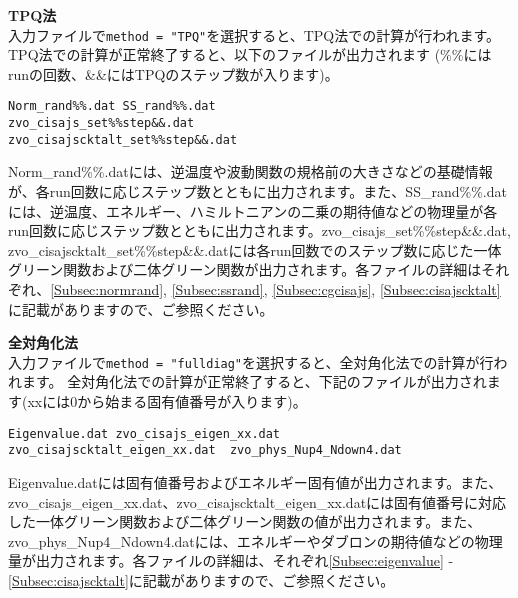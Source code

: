\begin{description}
\item {\bf TPQ法}\\
  入力ファイルで\verb|method = "TPQ"|を選択すると、TPQ法での計算が行われます。
  TPQ法での計算が正常終了すると、以下のファイルが出力されます
  (\%\%にはrunの回数、\&\&にはTPQのステップ数が入ります)。\\
\begin{minipage}{14cm}
\begin{screen}
\begin{verbatim}
Norm_rand%%.dat SS_rand%%.dat
zvo_cisajs_set%%step&&.dat  
zvo_cisajscktalt_set%%step&&.dat  
\end{verbatim}
\end{screen}
\end{minipage}
Norm\_rand\%\%.datには、逆温度や波動関数の規格前の大きさなどの基礎情報が、各run回数に応じステップ数とともに出力されます。また、SS\_rand\%\%.datには、逆温度、エネルギー、ハミルトニアンの二乗の期待値などの物理量が各run回数に応じステップ数とともに出力されます。zvo\_cisajs\_set\%\%step\&\&.dat, zvo\_cisajscktalt\_set\%\%step\&\&.datには各run回数でのステップ数に応じた一体グリーン関数および二体グリーン関数が出力されます。各ファイルの詳細はそれぞれ、\ref{Subsec:normrand}, \ref{Subsec:ssrand}, \ref{Subsec:cgcisajs}, \ref{Subsec:cisajscktalt}に記載がありますので、ご参照ください。

\item {\bf 全対角化法}\\
入力ファイルで\verb|method = "fulldiag"|を選択すると、全対角化法での計算が行われます。
全対角化法での計算が正常終了すると、下記のファイルが出力されます(xxには0から始まる固有値番号が入ります)。\\
\begin{minipage}{14cm}
\begin{screen}
\begin{verbatim}
Eigenvalue.dat zvo_cisajs_eigen_xx.dat
zvo_cisajscktalt_eigen_xx.dat  zvo_phys_Nup4_Ndown4.dat
\end{verbatim}
\end{screen}
\end{minipage}

Eigenvalue.datには固有値番号およびエネルギー固有値が出力されます。また、zvo\_cisajs\_eigen\_xx.dat、zvo\_cisajscktalt\_eigen\_xx.datには固有値番号に対応した一体グリーン関数および二体グリーン関数の値が出力されます。また、zvo\_phys\_Nup4\_Ndown4.datには、エネルギーやダブロンの期待値などの物理量が出力されます。各ファイルの詳細は、それぞれ\ref{Subsec:eigenvalue} - \ref{Subsec:cisajscktalt}に記載がありますので、ご参照ください。

\end{description}

